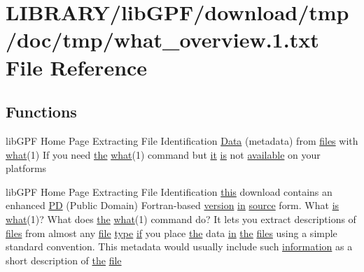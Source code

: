 \hypertarget{what__overview_81_8txt}{}\section{L\+I\+B\+R\+A\+R\+Y/lib\+G\+P\+F/download/tmp/doc/tmp/what\+\_\+overview.1.txt File Reference}
\label{what__overview_81_8txt}
\subsection*{Functions}
\begin{DoxyCompactItemize}
\item 
lib\+G\+PF Home Page Extracting File Identification \hyperlink{what__overview_81_8txt_a7483c2b9bbf430d46a9822c512d71bea}{Data} (metadata) from \hyperlink{ufpp__overview_81_8txt_a5673f2294ff1627be40c90eae33141ca}{files} with \hyperlink{what__overview_81_8txt_adadc702e2a3423fa136bfa5b1e01b511}{what}(1) If you need \hyperlink{M__stopwatch_83_8txt_a0f266597de2e57eb3aa964927bb30e14}{the} \hyperlink{what__overview_81_8txt_adadc702e2a3423fa136bfa5b1e01b511}{what}(1) command but \hyperlink{what__overview_81_8txt_ada5182f077041a6bc59b37d2cefe9b09}{it} \hyperlink{intro__blas1_83_8txt_a42a91df93f840595de3019ceb5d1df23}{is} not \hyperlink{M__stopwatch_83_8txt_ab4765d078d076a26632c886ad3875761}{available} on your platforms
\item 
lib\+G\+PF Home Page Extracting File Identification \hyperlink{M__stopwatch_83_8txt_ad62a52042bb610eee5b36b5516caec22}{this} download contains an enhanced \hyperlink{what__overview_81_8txt_a85f26da5a4481fbdb0d9c79f2b94de3e}{PD} (Public Domain) Fortran-\/based \hyperlink{inquiry__stopwatch_83_8txt_aee378be19d20935dd436517beda00ee4}{version} \hyperlink{M__journal_83_8txt_afce72651d1eed785a2132bee863b2f38}{in} \hyperlink{ufpp__overview_81_8txt_a4d6669ece605d05985c83a04dd38e0ad}{source} form. What \hyperlink{intro__blas1_83_8txt_a42a91df93f840595de3019ceb5d1df23}{is} \hyperlink{what__overview_81_8txt_adadc702e2a3423fa136bfa5b1e01b511}{what}(1)? What does \hyperlink{M__stopwatch_83_8txt_a0f266597de2e57eb3aa964927bb30e14}{the} \hyperlink{what__overview_81_8txt_adadc702e2a3423fa136bfa5b1e01b511}{what}(1) command do? It lets you extract descriptions of \hyperlink{ufpp__overview_81_8txt_a5673f2294ff1627be40c90eae33141ca}{files} from almost any \hyperlink{what__overview_81_8txt_a447b56c526e8da30e0dc94673727ee25}{file} \hyperlink{stop__watch_83_8txt_a70f0ead91c32e25323c03265aa302c1c}{type} \hyperlink{exit_87_8txt_a77395982f8d25581c808c40f3b634d90}{if} you place \hyperlink{M__stopwatch_83_8txt_a0f266597de2e57eb3aa964927bb30e14}{the} data \hyperlink{M__journal_83_8txt_afce72651d1eed785a2132bee863b2f38}{in} \hyperlink{M__stopwatch_83_8txt_a0f266597de2e57eb3aa964927bb30e14}{the} \hyperlink{ufpp__overview_81_8txt_a5673f2294ff1627be40c90eae33141ca}{files} using a simple standard convention. This metadata would usually include such \hyperlink{M__stopwatch_83_8txt_a9f7f0ce21871efda7da3eda76d1d3cff}{information} as a short description of \hyperlink{M__stopwatch_83_8txt_a0f266597de2e57eb3aa964927bb30e14}{the} \hyperlink{what__overview_81_8txt_a447b56c526e8da30e0dc94673727ee25}{file}

\end{DoxyCompactItemize}
